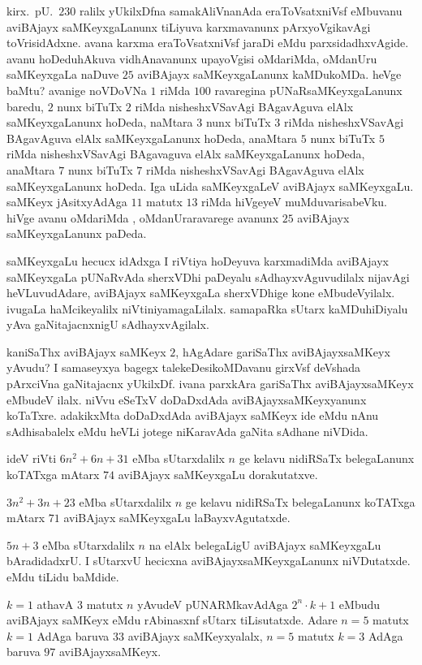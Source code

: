 kirx.~pU.\ $230$ ralilx yUkilxDfna samakAliVnanAda eraToVsatxniVsf eMbuvanu aviBAjayx saMKeyxgaLanunx tiLiyuva karxmavanunx pArxyoVgikavAgi toVrisidAdxne. avana karxma eraToVsatxniVsf jaraDi eMdu parxsidadhxvAgide. avanu hoDeduhAkuva vidhAna\-vanunx upayoVgisi oMdariMda, oMdanUru saMKeyxgaLa naDuve $25$ aviBAjayx saMKeyxgaLanunx kaMDukoMDa. heVge baMtu? avanige noVDoVNa $1$ riMda $100$ ravaregina pUNaRsaMKeyxgaLanunx baredu, $2$ nunx biTuTx $2$ riMda nisheshxVSavAgi BAgavAguva elAlx saMKeyxgaLanunx hoDeda, naMtara $3$ nunx biTuTx $3$ riMda nisheshxVSavAgi BAgavAguva elAlx saMKeyxgaLanunx hoDeda, anaMtara $5$ nunx biTuTx $5$ riMda nisheshxVSavAgi BAgavaguva elAlx saMKeyxgaLanunx hoDeda, anaMtara $7$ nunx biTuTx $7$ riMda nisheshxVSavAgi BAgavAguva elAlx saMKeyxgaLanunx hoDeda. Iga uLida saMKeyxgaLeV aviBAjayx saMKeyxgaLu. saMKeyx jAsitxyAdAga $11$ matutx $13$ riMda hiVgeyeV muMduvarisabeVku. hiVge avanu oMdariMda , oMdanUraravarege avanunx $25$ aviBAjayx saMKeyxgaLanunx paDeda.

saMKeyxgaLu hecucx idAdxga I riVtiya hoDeyuva karxmadiMda aviBAjayx saMKeyxgaLa pUNaRvAda sherxVDhi paDeyalu sAdhayxvAguvudilalx nijavAgi heVLuvudAdare, aviBAjayx saMKeyxgaLa sherxVDhige kone eMbudeVyilalx. ivugaLa haMcikeyalilx niVtiniyamagaLilalx. samapaRka sUtarx kaMDuhiDiyalu yAva gaNitajacnxnigU sAdhayxvAgilalx. 

kaniSaThx aviBAjayx saMKeyx $2$, hAgAdare gariSaThx aviBAjayxsaMKeyx yAvudu? I samaseyxya bagegx talekeDesikoMDavanu girxVsf deVshada pArxciVna gaNitajacnx yUkilxDf. ivana parxkAra gariSaThx aviBAjayxsaMKeyx eMbudeV ilalx. niVvu eSeTxV doDaDxdAda aviBAjayxsaMKeyxyanunx koTaTxre. adakikxMta doDaDxdAda aviBAjayx saMKeyx ide eMdu nAnu sAdhisabalelx eMdu heVLi jotege niKaravAda gaNita sAdhane niVDida.

ideV riVti $6n^2+6n+31$ eMba sUtarxdalilx $n$ ge kelavu nidiRSaTx belegaLanunx koTATxga mAtarx $74$ aviBAjayx saMKeyxgaLu dorakutatxve.

$3n^2+3n+23$ eMba sUtarxdalilx $n$ ge kelavu nidiRSaTx belegaLanunx koTATxga mAtarx $71$ aviBAjayx saMKeyxgaLu laBayxvAgutatxde.

$5n+3$ eMba sUtarxdalilx $n$ na elAlx belegaLigU aviBAjayx saMKeyxgaLu bAradidadxrU. I sUtarxvU hecicxna aviBAjayxsaMKeyxgaLanunx niVDutatxde. eMdu tiLidu baMdide.

$k=1$ athavA $3$ matutx $n$ yAvudeV pUNARMkavAdAga $2^{n}\cdot k+1$ eMbudu aviBAjayx saMKeyx eMdu rAbinasxnf sUtarx tiLisutatxde. Adare $n=5$ matutx $k=1$ AdAga baruva $33$ aviBAjayx saMKeyxyalalx, $n=5$ matutx $k=3$ AdAga baruva $97$ aviBAjayxsaMKeyx.

